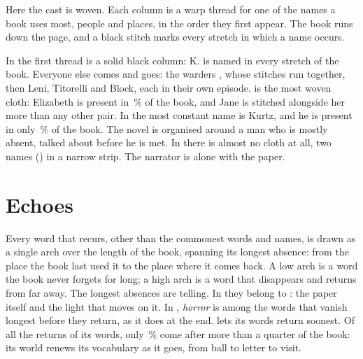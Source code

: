 \noindent Here the cast is woven. Each column is a warp thread for one of the
names a book uses most, people and places, in the order they first appear.
The book runs down the page, and a black stitch marks every stretch in which a
name occurs.

In  the first thread is a solid black column: K. is named in
every stretch of the book. Everyone else comes and goes: the warders
, whose stitches run together, then Leni, Titorelli and
Block, each in their own episode.  is the most woven
cloth: Elizabeth is present in \,\% of the
book, and Jane is stitched alongside her more than any other pair. In
 the most constant name is Kurtz, and he is present in only
\,\% of the book. The novel is organised
around a man who is mostly absent, talked about before he is met. In
 there is almost no cloth at all, two names
() in a narrow strip. The narrator is alone with
the paper.


\clearpage
\section{Echoes}


\noindent Every word that recurs, other than the commonest words and names, is
drawn as a single arch over the length of the book, spanning its longest
absence: from the place the book last used it to the place where it comes back.
A low arch is a word the book never forgets for long; a high arch is a word
that disappears and returns from far away. The longest absences are telling. In
 they belong to :
the paper itself and the light that moves on it. In ,
\emph{horror} is among the words that vanish longest before they return, as it
does at the end.  lets its words return soonest. Of all
the returns of its words, only \,\% come
after more than a quarter of the book: its world renews its vocabulary as it
goes, from ball to letter to visit.


